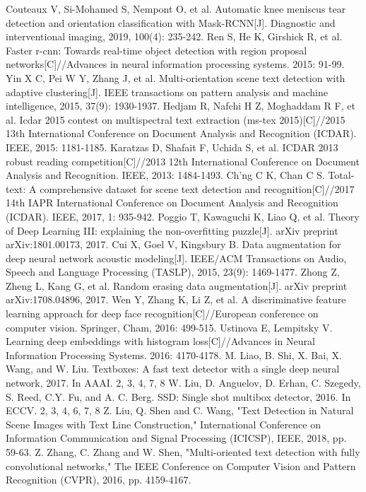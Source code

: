 \documentclass[22pt, UTF8]{article}
\numberwithin{figure}{section}
\numberwithin{table}{section}
\numberwithin{equation}{section} %
\begin{document}
\begin{thebibliography}{42}
\bibitem{}
Couteaux V, Si-Mohamed S, Nempont O, et al. Automatic knee meniscus tear detection and orientation classification with Mask-RCNN[J]. Diagnostic and interventional imaging, 2019, 100(4): 235-242.
\bibitem{}
Ren S, He K, Girshick R, et al. Faster r-cnn: Towards real-time object detection with region proposal networks[C]//Advances in neural information processing systems. 2015: 91-99.
\bibitem{}
Yin X C, Pei W Y, Zhang J, et al. Multi-orientation scene text detection with adaptive clustering[J]. IEEE transactions on pattern analysis and machine intelligence, 2015, 37(9): 1930-1937.
\bibitem{}
Hedjam R, Nafchi H Z, Moghaddam R F, et al. Icdar 2015 contest on multispectral text extraction (ms-tex 2015)[C]//2015 13th International Conference on Document Analysis and Recognition (ICDAR). IEEE, 2015: 1181-1185.
\bibitem{}
Karatzas D, Shafait F, Uchida S, et al. ICDAR 2013 robust reading competition[C]//2013 12th International Conference on Document Analysis and Recognition. IEEE, 2013: 1484-1493.
\bibitem{}
Ch'ng C K, Chan C S. Total-text: A comprehensive dataset for scene text detection and recognition[C]//2017 14th IAPR International Conference on Document Analysis and Recognition (ICDAR). IEEE, 2017, 1: 935-942.
\bibitem{}
Poggio T, Kawaguchi K, Liao Q, et al. Theory of Deep Learning III: explaining the non-overfitting puzzle[J]. arXiv preprint arXiv:1801.00173, 2017.
\bibitem{}
Cui X, Goel V, Kingsbury B. Data augmentation for deep neural network acoustic modeling[J]. IEEE/ACM Transactions on Audio, Speech and Language Processing (TASLP), 2015, 23(9): 1469-1477.
\bibitem{}
Zhong Z, Zheng L, Kang G, et al. Random erasing data augmentation[J]. arXiv preprint arXiv:1708.04896, 2017.
\bibitem{}
Wen Y, Zhang K, Li Z, et al. A discriminative feature learning approach for deep face recognition[C]//European conference on computer vision. Springer, Cham, 2016: 499-515.
\bibitem{}
Ustinova E, Lempitsky V. Learning deep embeddings with histogram loss[C]//Advances in Neural Information Processing Systems. 2016: 4170-4178.
\bibitem{}
M. Liao, B. Shi, X. Bai, X. Wang, and W. Liu. Textboxes: A fast text detector with a single deep neural network, 2017. In AAAI. 2, 3, 4, 7, 8
\bibitem{}
W. Liu, D. Anguelov, D. Erhan, C. Szegedy, S. Reed, C.Y. Fu, and A. C. Berg. SSD: Single shot multibox detector, 2016. In ECCV. 2, 3, 4, 6, 7, 8
\bibitem{}
Z. Liu, Q. Shen and C. Wang, "Text Detection in Natural Scene Images with Text Line Construction," International Conference on Information Communication and Signal Processing (ICICSP), IEEE, 2018, pp. 59-63.
\bibitem{}
Z. Zhang, C. Zhang and W. Shen, "Multi-oriented text detection with fully convolutional networks," The IEEE Conference on Computer Vision and Pattern Recognition (CVPR), 2016, pp. 4159-4167.

\end{thebibliography}
\end{document}
